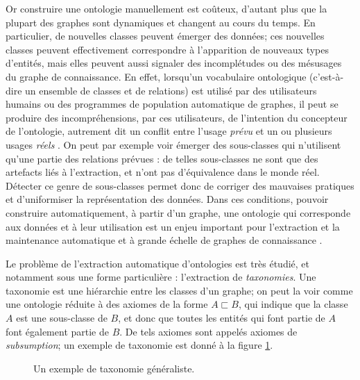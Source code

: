 Or construire une ontologie manuellement est coûteux, d'autant plus que la plupart des graphes sont dynamiques et changent au cours du temps. %
%
En particulier, de nouvelles classes peuvent émerger des données; ces nouvelles classes peuvent effectivement correspondre à l'apparition de nouveaux types d'entités, mais elles peuvent aussi signaler des incomplétudes ou des mésusages du graphe de connaissance.
En effet, lorsqu'un vocabulaire ontologique (c'est-à-dire un ensemble de classes et de relations) est utilisé par des utilisateurs humains ou des programmes de population automatique de graphes, il peut se produire des incompréhensions, par ces utilisateurs, de l'intention du concepteur de l'ontologie, autrement dit un conflit entre l'usage \textit{prévu} et un ou plusieurs usages \textit{réels} \cite{adrian2013inconsistency}. On peut par exemple voir émerger des sous-classes qui n'utilisent qu'une partie des relations prévues : de telles sous-classes ne sont que des artefacts liés à l'extraction, et n'ont pas d'équivalence dans le monde réel. Détecter ce genre de sous-classes permet donc de corriger des mauvaises pratiques et d'uniformiser la représentation des données. %
%
Dans ces conditions, pouvoir construire automatiquement, à partir d'un graphe, une ontologie qui corresponde aux données et à leur utilisation est un enjeu important pour l'extraction et la maintenance automatique et à grande échelle de graphes de connaissance \cite{zhou2007ontology}.

Le problème de l'extraction automatique d'ontologies est très étudié, et notamment sous une forme particulière : l'extraction de \textit{taxonomies}. Une taxonomie est une hiérarchie entre les classes d'un graphe; on peut la voir comme une ontologie réduite à des axiomes de la forme $A \sqsubset B$, qui indique que la classe $A$ est une sous-classe de $B$, et donc que toutes les entités qui font partie de $A$ font également partie de $B$. De tels axiomes sont appelés axiomes de \textit{subsumption}; un exemple de taxonomie est donné à la figure \ref{fig:intro-taxo}.

\begin{figure}[h]
    \centering
    
    \caption{Un exemple de taxonomie généraliste.}
    \label{fig:intro-taxo}
\end{figure}


